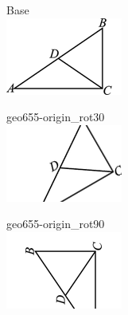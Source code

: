 \documentclass[12pt]{article}
\begin{document}
\begin{center}
\begin{minipage}{0.32\textwidth}\centering
Base\\
\includegraphics[width=0.95\linewidth]{out_rommath_origin/items/geo655-origin/assets/figure.png}
\end{minipage}
\hfill\begin{minipage}{0.32\textwidth}\centering
geo655-origin\_rot30\\
\includegraphics[width=0.95\linewidth]{out_rommath_origin/items/geo655-origin/assets/figure_rot30.png}
\end{minipage}
\hfill\begin{minipage}{0.32\textwidth}\centering
geo655-origin\_rot90\\
\includegraphics[width=0.95\linewidth]{out_rommath_origin/items/geo655-origin/assets/figure_rot90.png}

\end{minipage}
\end{center}
\end{document}
